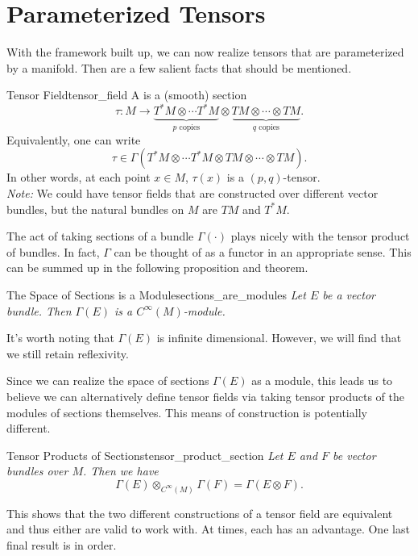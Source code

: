 \section{Parameterized Tensors}

With the framework built up, we can now realize tensors that are parameterized by a manifold.  Then are a few salient facts that should be mentioned.

\begin{df}{Tensor Field}{tensor_field}
A  is a (smooth) section
\[
\tau \colon M \to \underbrace{T^*M\otimes \cdots T^*M}_{\textrm{$p$ copies}} \otimes \underbrace{TM\otimes \cdots \otimes TM}_{\textrm{$q$ copies}}.
\]
Equivalently, one can write
\[
\tau \in \Gamma(T^*M\otimes \cdots T^*M\otimes TM \otimes \cdots \otimes TM).
\]
In other words, at each point $x\in M$, $\tau(x)$ is a $(p,q)$-tensor.\\

\emph{Note:} We could have tensor fields that are constructed over different vector bundles, but the natural bundles on $M$ are $TM$ and $T^*M$.
\end{df}

The act of taking sections of a bundle $\Gamma(\cdot)$ plays nicely with the tensor product of bundles.  In fact, $\Gamma$ can be thought of as a functor in an appropriate sense.  This can be summed up in the following proposition and theorem. 

\begin{prop}{The Space of Sections is a Module}{sections_are_modules}
\emph{Let $E$ be a vector bundle. Then $\Gamma(E)$ is a $C^\infty(M)$-module.}
\end{prop}

It's worth noting that $\Gamma(E)$ is infinite dimensional. However, we will find that we still retain reflexivity.

Since we can realize the space of sections $\Gamma(E)$ as a module, this leads us to believe we can alternatively define tensor fields via taking tensor products of the modules of sections themselves.  This means of construction is potentially different.

\begin{thm}{Tensor Products of Sections}{tensor_product_section}
\emph{Let $E$ and $F$ be vector bundles over $M$.  Then we have}
\[
\Gamma(E)\otimes_{C^\infty(M)}\Gamma(F) = \Gamma(E\otimes F).
\]
\end{thm}

This shows that the two different constructions of a tensor field are equivalent and thus either are valid to work with.  At times, each has an advantage.  One last final result is in order.

